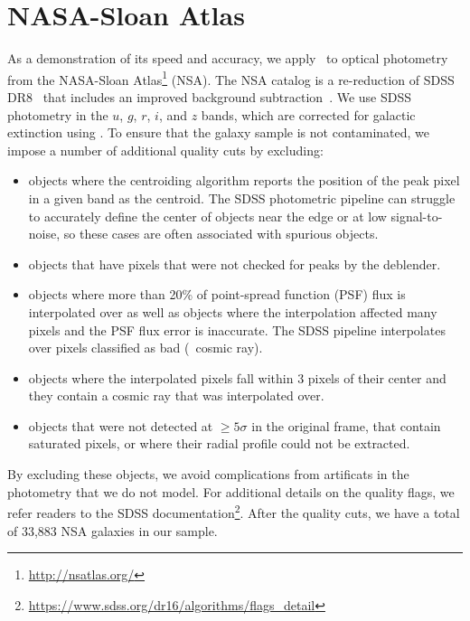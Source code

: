 \section{NASA-Sloan Atlas} \label{sec:obs}
As a demonstration of its speed and accuracy, we apply \sedflow~to optical
photometry from the NASA-Sloan Atlas\footnote{\url{http://nsatlas.org/}} (NSA).
The NSA catalog is a re-reduction of SDSS DR8~\citep{aihara2011} that includes
an improved background subtraction~\citep{blanton2011}.
We use SDSS photometry in the $u$, $g$, $r$, $i$, and $z$ bands, which are
corrected for galactic extinction using \cite{schlegel1998}.
To ensure that the galaxy sample is not contaminated, we impose a number of
additional quality cuts by excluding:
\begin{itemize}
    \item objects where the centroiding algorithm reports the
    position of the peak pixel in a given band as the centroid. 
    The SDSS photometric pipeline can struggle to accurately define the center
    of objects near the edge or at low signal-to-noise, so these cases are
    often associated with spurious objects. 
    \item objects that have pixels that were not checked for peaks by the
    deblender. 
    \item objects where more than 20\% of point-spread function (PSF) flux is
    interpolated over as well as objects where the interpolation affected many
    pixels and the PSF flux error is inaccurate. 
    The SDSS pipeline interpolates over pixels classified as bad (\eg~cosmic
    ray).
    \item objects where the interpolated pixels fall within 3 pixels of their
    center and they contain a cosmic ray that was interpolated over.
    \item objects that were not detected at $\ge5\sigma$ in the original frame,
    that contain saturated pixels, or where their radial profile could not be
    extracted.
\end{itemize}
By excluding these objects, we avoid complications from artificats in the
photometry that we do not model. 
For additional details on the quality flags, we refer readers to the SDSS
documentation\footnote{\url{https://www.sdss.org/dr16/algorithms/flags_detail}}.
After the quality cuts, we have a total of 33,883 NSA galaxies in our sample.


